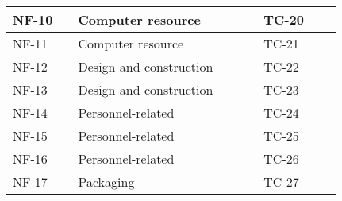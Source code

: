 \begin{sidewaystable}
\begin{longtable}{| p{1.1cm}  | p{2cm}  | p{5cm} |  p{1.5cm}  | p{1.5cm}  |  p{1.5cm}  | p{1.5cm}  |  p{1.5cm}  | p{2cm}  |  }
		NF-10&& Computer resource&&&& TC-20 && \\ \hline
		NF-11&& Computer resource&&&& TC-21 && \\ \hline
		NF-12&& Design and construction&&&& TC-22 && \\ \hline
		NF-13&& Design and construction&&&& TC-23 && \\ \hline
		NF-14&& Personnel-related&&&& TC-24 && \\ \hline
		NF-15&& Personnel-related&&&& TC-25 && \\ \hline
		NF-16&& Personnel-related&&&& TC-26 && \\ \hline
		NF-17&& Packaging&&&& TC-27 && \\ \hline
	\end{longtable}
\end{sidewaystable}